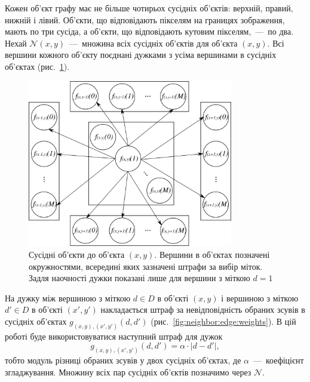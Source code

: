 Кожен об'єкт графу має не більше чотирьох сусідніх об'єктів: верхній, правий,
нижній і лівий.
Об'єкти, що відповідають пікселям на границях зображення, мають по три сусіда,
а об'єкти, що відповідають кутовим пікселям,~---~по два.
Нехай $\mathcal{N} \left( x, y \right) $~---~множина всіх
сусідніх об'єктів для об'єкта $\left( x, y \right)$.
Всі вершини кожного об'єкту поєднані дужками з усіма
вершинами в сусідніх об'єктах (рис.~\ref{fig:neighbors}).

\begin{figure}[h]
  \centering
  \includegraphics[width=0.8\textwidth]{images/neighbors}
  \caption{Сусідні об'єкти до об'єкта $\left(x, y \right)$.
           Вершини в об'єктах позначені окружностями,
           всередині яких зазначені штрафи за вибір міток.
           Задля наочності дужки показані лише для вершини з міткою $d = 1$}
  \label{fig:neighbors}
\end{figure}

На дужку між вершиною з міткою $d \in D$ в об'єкті $\left(x, y \right)$
і вершиною з міткою $d' \in D$ в об'єкті $\left(x', y' \right)$
накладається штраф за невідповідність обраних зсувів в сусідніх об'єктах
$g_{\left(x, y \right), \left(x', y' \right)} \left(d, d' \right)$
(рис.~\ref{fig:neighbor:edge:weights}).
В цій роботі буде використовуватися наступний штраф для дужок
\begin{equation*}
    g_{\left(x, y \right), \left(x', y' \right)} \left(d, d' \right) =
        \alpha \cdot \left| d - d' \right|,
\end{equation*}
тобто модуль різниці обраних зсувів у двох сусідніх об'єктах,
де $\alpha$~---~коефіцієнт згладжування.
Множину всіх пар сусідніх об'єктів позначимо через $\mathcal{N}$.

